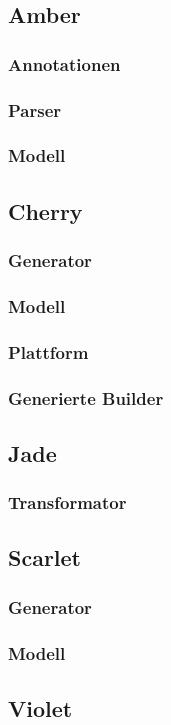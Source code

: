 \documentclass[12pt,oneside,a4paper,parskip]{scrbook}
\begin{document}
\subsection{Amber}
\subsubsection{Annotationen}
\subsubsection{Parser}
\subsubsection{Modell}
\subsection{Cherry}
\subsubsection{Generator}
\subsubsection{Modell}
\subsubsection{Plattform}
\subsubsection{Generierte Builder}
\subsection{Jade}
\subsubsection{Transformator}
\subsection{Scarlet}
\subsubsection{Generator}
\subsubsection{Modell}
\subsection{Violet}
\end{document}
